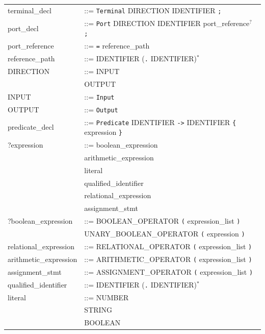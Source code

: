 \begin{longtable}{
>{\ttfamily\small}p{}
>{\raggedright\arraybackslash\small}p{}
}
terminal\_decl & ::= \texttt{Terminal} DIRECTION  IDENTIFIER \texttt{;}\\

port\_decl & ::= \texttt{Port} DIRECTION IDENTIFIER port_reference$^{?}$ \texttt{;}\\

port\_reference & ::= \texttt{=} reference_path\\

reference\_path & ::= IDENTIFIER (\texttt{.} IDENTIFIER)$^{*}$\\

DIRECTION & ::= INPUT\\
& \textbar{} OUTPUT\\

INPUT & ::= \texttt{Input}\\

OUTPUT & ::= \texttt{Output}\\

predicate\_decl & ::= \texttt{Predicate} IDENTIFIER  \texttt{->} IDENTIFIER \texttt{\{} expression \texttt{\}}\\

?expression & ::= boolean_expression\\
& \textbar{} arithmetic_expression\\
& \textbar{} literal\\
& \textbar{} qualified_identifier\\
& \textbar{} relational_expression\\
& \textbar{} assignment_stmt\\

?boolean\_expression & ::= BOOLEAN_OPERATOR \texttt{(} expression_list \texttt{)}\\
& \textbar{} UNARY_BOOLEAN_OPERATOR \texttt{(} expression \texttt{)}\\

relational\_expression & ::= RELATIONAL_OPERATOR \texttt{(} expression_list \texttt{)}\\

arithmetic\_expression & ::= ARITHMETIC_OPERATOR \texttt{(} expression_list \texttt{)}\\

assignment\_stmt & ::= ASSIGNMENT_OPERATOR \texttt{(} expression_list \texttt{)}\\

qualified\_identifier & ::= IDENTIFIER (\texttt{.} IDENTIFIER)$^{*}$\\

literal & ::= NUMBER\\
& \textbar{} STRING\\
& \textbar{} BOOLEAN\\


\end{longtable}
